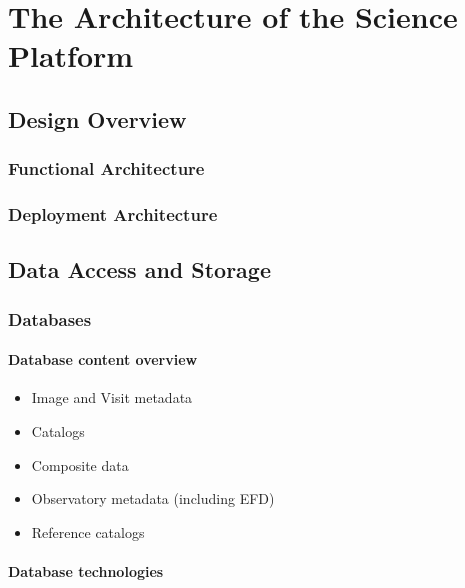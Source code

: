 \section{The Architecture of the Science Platform}\label{architecture}

\subsection{Design Overview}\label{design-overview}

\subsubsection{Functional Architecture}\label{functional-architecture}

\subsubsection{Deployment Architecture}\label{deployment-architecture}

\subsection{Data Access and Storage}\label{data-access-and-storage}

\subsubsection{Databases}\label{databases}

\paragraph{Database content overview}\label{database-content-overview}

\begin{itemize}
\item Image and Visit metadata
\item Catalogs
\item Composite data
\item Observatory metadata (including EFD)
\item Reference catalogs
\end{itemize}

\paragraph{Database technologies}\label{database-technologies}

